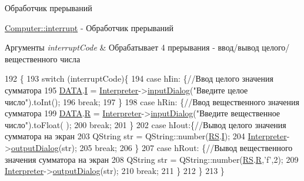 Обработчик прерываний 

\hyperlink{class_computer_aa57b0ed2f3a9b168c2924174ec524bd4}{Computer\+::interrupt} -\/ Обработчик прерываний


\begin{DoxyParams}{Аргументы}
{\em interrupt\+Code} & Обрабатывает 4 прерывания -\/ ввод/вывод целого/вещественного числа \\
\hline
\end{DoxyParams}

\begin{DoxyCode}
192 \{
193     \textcolor{keywordflow}{switch} (interruptCode)\{
194     \textcolor{keywordflow}{case} hIin: \{\textcolor{comment}{//Ввод целого значения сумматора}
195         \hyperlink{class_computer_adb154047da2156e4419af3b3a4a766b7}{DATA}.\hyperlink{union_computer_1_1data_a6e51de6e0351adc4e50b336a092bc4bb}{I} = \hyperlink{class_computer_aa58d6e565412d6705657c0418b1e59fe}{Interpreter}->\hyperlink{classinterpreter_a30d9b904383c7b73adceeca002461431}{inputDialog}(\textcolor{stringliteral}{"Введите целое число"}).toInt();
196         \textcolor{keywordflow}{break};
197     \}
198     \textcolor{keywordflow}{case} hRin: \{\textcolor{comment}{//Ввод вещественного значения сумматора}
199         \hyperlink{class_computer_adb154047da2156e4419af3b3a4a766b7}{DATA}.\hyperlink{union_computer_1_1data_acbf8c96e22bd094bcbb4014818e3570d}{R} = \hyperlink{class_computer_aa58d6e565412d6705657c0418b1e59fe}{Interpreter}->\hyperlink{classinterpreter_a30d9b904383c7b73adceeca002461431}{inputDialog}(\textcolor{stringliteral}{"Введите вещественное число"}).toFloat(
      );
200         \textcolor{keywordflow}{break};
201     \}
202     \textcolor{keywordflow}{case} hIout:\{\textcolor{comment}{//Вывод целого значения сумматора на экран}
203         QString str = QString::number(\hyperlink{class_computer_a874503110664b3cf821118d2ce9c2b96}{RS}.\hyperlink{union_computer_1_1data_a6e51de6e0351adc4e50b336a092bc4bb}{I});
204         \hyperlink{class_computer_aa58d6e565412d6705657c0418b1e59fe}{Interpreter}->\hyperlink{classinterpreter_a5d3ba23a48b814586dabbe2e3507b93a}{outputDialog}(str);
205         \textcolor{keywordflow}{break};
206     \}
207     \textcolor{keywordflow}{case} hRout: \{\textcolor{comment}{//Вывод вещественного значения сумматора на экран}
208         QString str = QString::number(\hyperlink{class_computer_a874503110664b3cf821118d2ce9c2b96}{RS}.\hyperlink{union_computer_1_1data_acbf8c96e22bd094bcbb4014818e3570d}{R},\textcolor{charliteral}{'f'},2);
209         \hyperlink{class_computer_aa58d6e565412d6705657c0418b1e59fe}{Interpreter}->\hyperlink{classinterpreter_a5d3ba23a48b814586dabbe2e3507b93a}{outputDialog}(str);
210         \textcolor{keywordflow}{break};
211     \}
212     \}
213 \}
\end{DoxyCode}
\hypertarget{class_computer_adeb4bbeee2b9c13616dc8c4ef52cbe60}{}\label{class_computer_adeb4bbeee2b9c13616dc8c4ef52cbe60} 
